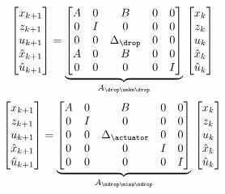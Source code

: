 %
\begin{equation}
    \begin{bmatrix}
        x_{k+1} \\
        z_{k+1} \\
        u_{k+1} \\
        \hat x_{k+1} \\
        \hat u_{k+1}
    \end{bmatrix} = \underbrace{\begin{bmatrix}
        A & 0 & B & 0 & 0 \\
        0 & I & 0 & 0 & 0 \\
        0 & 0 & \Delta_\drop & 0 & 0 \\
        A & 0 & B & 0 & 0 \\
        0 & 0 & 0 & 0 & I \\
    \end{bmatrix}}_{A_{\drop\unkn\drop}}\, \begin{bmatrix}
        x_{k} \\
        z_{k} \\
        u_{k} \\
        \hat x_{k} \\
        \hat u_{k}
    \end{bmatrix}
\end{equation}
%
\begin{equation}
    \begin{bmatrix}
        x_{k+1} \\
        z_{k+1} \\
        u_{k+1} \\
        \hat x_{k+1} \\
        \hat u_{k+1}
    \end{bmatrix} = \underbrace{\begin{bmatrix}
        A & 0 & B & 0 & 0 \\
        0 & I & 0 & 0 & 0 \\
        0 & 0 & \Delta_\actuator & 0 & 0 \\
        0 & 0 & 0 & I & 0 \\
        0 & 0 & 0 & 0 & I \\
    \end{bmatrix}}_{A_{\ndrop\miss\ndrop}}\, \begin{bmatrix}
        x_{k} \\
        z_{k} \\
        u_{k} \\
        \hat x_{k} \\
        \hat u_{k}
    \end{bmatrix}
\end{equation}
